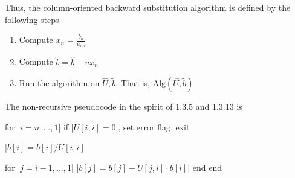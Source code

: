 \documentclass{report}
\begin{document}
    Thus, the column-oriented backward substitution algorithm is defined by the following steps
    \begin{enumerate}
        \item Compute $x_{n} = \frac{b_{n}}{u_{nn}} $
        \item Compute $\tilde{b} = \hat{b} - ux_{n} $
        \item Run the algorithm on $\hat{U}, \tilde{b}$. That is, $\text{Alg}(\hat{U}, \tilde{b})$
    \end{enumerate}
    \bigbreak \noindent 
    The non-recursive pseudocode in the spirit of 1.3.5 and 1.3.13 is
    \bigbreak \noindent 
    \begin{jlcode}
    for |$i=n,...,1$|
        if |$U[i,i] = 0$|, set error flag, exit

        |$b[i] = b[i] / U[i,i]$|

        for |$j = i-1,...,1$|
            |$b[j] = b[j] - U[j,i] \cdot b[i]$|
        end
    end
    \end{jlcode}
\end{document}
